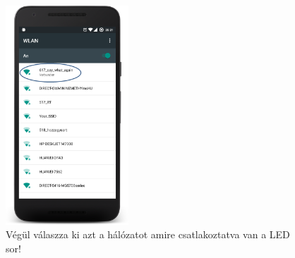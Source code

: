 \documentclass[../main.tex]{subfiles}
\begin{document}
            \begin{figure}[h!]
                \begin{floatrow}
                \end{floatrow}
            \end{figure}
            \begin{figure}[!h]
                \centering
                \includegraphics[width=4.6cm]{android_res/screen_pictures/wifi_err_03.png}
                \caption{Végül válaszza ki azt a hálózatot amire csatlakoztatva van a LED sor!}
                \label{fig:wifi_err_03}
            \end{figure}
        
\end{document}

